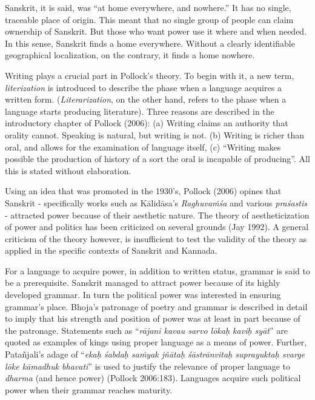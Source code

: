Sanskrit, it is said, was “at home everywhere, and nowhere.” It has no single, traceable place of origin. This meant that no single group of people can claim ownership of Sanskrit. But those who want power use it where and when needed. In this sense, Sanskrit finds a home everywhere. Without a clearly identifiable geographical localization, on the contrary, it finds a home nowhere.

Writing plays a crucial part in Pollock’s theory. To begin with it, a new term, {\sl literization} is introduced to describe the phase when a language acquires a written form. ({\sl Literarization}, on the other hand, refers to the phase when a language starts producing literature). Three reasons are described in the introductory chapter of Pollock (2006): (a) Writing claims an authority that orality cannot. Speaking is natural, but writing is not. (b) Writing is richer than oral, and allows for the examination of language itself, (c) “Writing makes possible the production of history of a sort the oral is incapable of producing”. All this is stated without elaboration.

Using an idea that was promoted in the 1930’s, Pollock (2006) opines that Sanskrit - specifically works such as Kālidāsa’s {\sl Raghuvaṁśa} and various {\sl praśastis} - attracted power because of their aesthetic nature. The theory of aestheticization of power and politics has been criticized on several grounds (Jay  1992). A general criticism of the theory however, is insufficient to test the validity of the theory as applied in the specific contexts of Sanskrit and Kannada. 

For a language to acquire power, in addition to written status, grammar is said to be a prerequisite. Sanskrit managed to attract power because of its highly developed grammar. In turn the political power was interested in ensuring grammar’s place. Bhoja’s patronage of poetry and grammar is described in detail to imply that his strength and position of power was at least in part because of the patronage. Statements such as “{\sl rājani kavau sarvo lōkaḥ kaviḥ syāt}” are quoted as examples of kings using proper language as a means of power. Further, Patañjali’s adage of “{\sl ekaḥ śabdaḥ saṁyak jñātaḥ śāstrānvitaḥ suprayuktaḥ svarge lōke kāmadhuk bhavati}” is used to justify the relevance of proper language to {\sl dharma} (and hence power) (Pollock 2006:183). Languages acquire such political power when their grammar reaches maturity.


